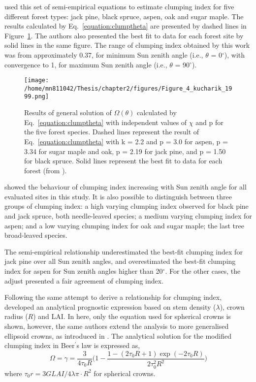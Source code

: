 \citet{Kucharik1999} used this set of semi-empirical equations to estimate clumping index for five different forest types: jack pine, black spruce, aspen, oak and sugar maple. The results calculated by Eq.~\ref{equation:clumptheta} are presented by dashed lines in Figure~\ref{f:kucharik}. The authors also presented the best fit to data for each forest site by solid lines in the same figure. The range of clumping index obtained by this work was from approximately 0.37, for minimum Sun zenith angle (i.e., $\theta$ = 0$^{\circ}$), with convergence to 1, for maximum Sun zenith angle (i.e., $\theta$ = 90$^{\circ}$).

\begin{figure}[ht!]
\centering
\texttt{[image: /home/mn811042/Thesis/chapter2/figures/Figure\_4\_kucharik\_1999.png]}
\caption{Results of general solution of $\Omega(\theta)$ calculated by Eq.~\ref{equation:clumptheta} with independent values of $\chi$ and p for the five forest species. Dashed lines represent the result of Eq.~\ref{equation:clumptheta} with k = 2.2 and p = 3.0 for aspen, p = 3.34 for sugar maple and oak, p = 2.19 for jack pine, and p = 1.50 for black spruce. Solid lines represent the best fit to data for each forest (from \citet{Kucharik1999}).}
\label{f:kucharik}
\end{figure}

\citet{Kucharik1999} showed the behaviour of clumping index increasing with Sun zenith angle for all evaluated sites in this study. It is also possible to distinguish between three groups of clumping index: a high varying clumping index observed for black pine and jack spruce, both needle-leaved species; a medium varying clumping index for aspen; and a low varying clumping index for oak and sugar maple; the last tree broad-leaved species. 

The semi-empirical relationship underestimated the best-fit clumping index for jack pine over all Sun zenith angles, and overestimated the best-fit clumping index for aspen for Sun zenith angles higher than 20$^{\circ}$. For the other cases, the adjust presented a fair agreement of clumping index.

Following the same attempt to derive a relationship for clumping index, \citet{Ni-Meister2010} developed an analytical prognostic expression based on stem density ($\lambda$), crown radius ($R$) and LAI. In here, only the equation used for spherical crowns is shown, however, the same authors extend the analysis to more generalised ellipsoid crowns, as introduced in \citet{Li1988}. The analytical solution for the modified clumping index in Beer$^{\prime}$s law is expressed as, 
\begin{equation}
\Omega = \gamma = \frac{3}{4\tau_0R}\Big(1 - \frac{1 - (2\tau_0R + 1)\exp(-2\tau_0R)}{2\tau_0^2R^2}\Big)
\label{equation:clumpNi}
\end{equation}
\noindent where $\tau_0r = 3 G LAI/ 4 \lambda \pi \cdot R^2$ for spherical crowns.


